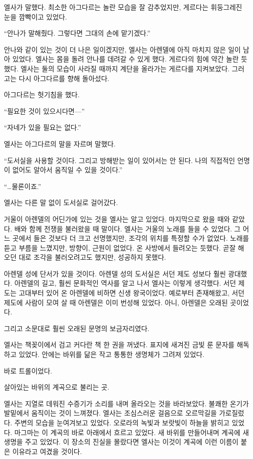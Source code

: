 엘사가 말했다. 최소한 아그다르는 놀란 모습을 잘 감추었지만, 게르다는 휘둥그레진 눈을 깜빡이고 있었다.

``안나가 말해줬다. 그렇다면 그대의 손에 맡기겠다.''

안나와 같이 있는 것이 더 나은 일이겠지만, 엘사는 아렌델에 아직 마치지 않은 일이 남아 있었다. 엘사는 몸을 돌려 안나를 데려갈 수 있게 했다. 게르다의 힘에 약간 놀란 듯했다. 엘사는 둘의 모습이 사라질 때까지 계단을 올라가는 게르다를 지켜보았다. 그러고는 다시 아그다르를 향해 돌아섰다.

아그다르는 헛기침을 했다.

``필요한 것이 있으시다면—''

``자네가 있을 필요는 없다.''

엘사는 아그다르의 말을 자르며 말했다.

``도서실을 사용할 것이다. 그리고 방해받는 일이 있어서는 안 된다. 나의 직접적인 언명이 없어도 알아서 움직일 수 있을 것이다.''

``…물론이죠.''

엘사는 다른 말 없이 도서실로 걸어갔다.

거울이 아렌델의 어딘가에 있는 것을 엘사는 알고 있었다. 마지막으로 왔을 때와 같았다. 배와 함께 전쟁을 불러왔을 때 말이다. 엘사는 거울의 노래를 들을 수 있었다. 그 어느 곳에서 들은 것보다 더 크고 선명했지만, 조각의 위치를 특정할 수가 없었다. 노래를 듣고 부름을 느꼈지만, 방향이, 근원이 없었다. 온 사방에서 들려오는 듯했다. 곧잘 해 오던 대로 조각을 불러오려고도 했지만, 성공하지 못했다.

아렌델 성에 단서가 있을 것이다. 아렌델 성의 도서실은 서던 제도 성보다 훨씬 광대했다. 아렌델의 길고, 훨씬 문화적인 역사를 알고 나서 엘사는 이렇게 생각했다. 서던 제도는 고대부터 있어 온 아렌델에 비하면 신생 왕국이었다. 예로부터 존재해왔고, 서던 제도에 사람이 모여 살 때 아렌델은 이미 번성해 있었다. 아니, 아렌델은 오래된 곳이었다.

그리고 소문대로 훨씬 오래된 문명의 보금자리였다.

엘사는 책꽂이에서 검고 커다란 책 한 권을 꺼냈다. 표지에 새겨진 금빛 룬 문자를 해독하고 있었다. 안에는 바위를 닮은 작고 통통한 생명체가 그려져 있었다.

바로 트롤이었다.

\textbreak

살아있는 바위의 계곡으로 불리는 곳.

엘사는 지열로 데워진 수증기가 소리를 내며 올라오는 것을 바라보았다. 불쾌한 온기가 발밑에서 움직이는 것이 느껴졌다. 엘사는 조심스러운 걸음으로 오르막길을 가로질렀다. 주변의 모습을 눈여겨보고 있었다. 오로라의 녹빛과 보랏빛이 하늘을 밝히고 있었다. 마그마는 이 계곡의 바로 아래에서 흐르고 있었다. 새 바위를 만들어내며 계곡에 새 생명을 주고 있었다. 이 장소의 진실을 몰랐다면 엘사는 이것이 계곡에 이런 이름이 붙은 이유라고 여겼을 것이다.

